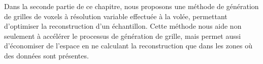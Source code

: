 {    %

   
    
    
    Dans la seconde partie de ce chapitre, nous proposons une méthode de génération de grilles de voxels à résolution variable effectuée à la volée, permettant d'optimiser la reconstruction d'un échantillon. Cette méthode nous aide non seulement à accélérer le processus de génération de grille, mais permet aussi d'économiser de l'espace en ne calculant la reconstruction que dans les zones où des données sont présentes. %

}
